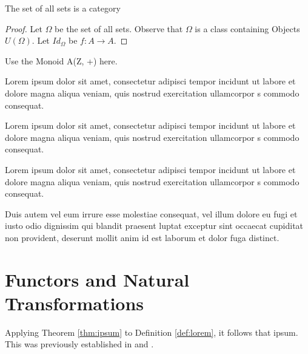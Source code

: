 \documentclass{article}
\begin{document}
\begin{theorem}
  The set of all sets is a category
\end{theorem}

\begin{proof}
Let $\Omega$ be the set of all sets. Observe that $\Omega$ is a class containing Objects $U(\Omega)$. Let $Id_{\Omega}$ be $f: A \to A$.
\end{proof}

\begin{example}
Use the Monoid A(Z, +) here.
\end{example}

Lorem ipsum dolor sit amet, consectetur adipisci tempor incidunt ut labore et dolore magna aliqua veniam, quis nostrud exercitation ullamcorpor s commodo consequat. 

\begin{definition}\label{def:lorem}
	Lorem ipsum dolor sit amet, consectetur adipisci tempor incidunt ut labore et dolore magna aliqua veniam, quis nostrud exercitation ullamcorpor s commodo consequat.
\end{definition}

Lorem ipsum dolor sit amet, consectetur adipisci tempor incidunt ut labore et dolore magna aliqua veniam, quis nostrud exercitation ullamcorpor s commodo consequat. 

\begin{theorem}\label{thm:ipsum}
	Duis autem vel eum irrure esse molestiae consequat, vel illum dolore eu fugi et iusto odio dignissim qui blandit praesent luptat exceptur sint occaecat cupiditat non provident, deserunt mollit anim id est laborum et dolor fuga distinct.
\end{theorem}



\section{Functors and Natural Transformations}

Applying Theorem \ref{thm:ipsum} to Definition \ref{def:lorem}, it follows that ipsum. This was previously established in \cite{Gauss86} and \cite{Euclid02,Euclid03}.




\end{document}
